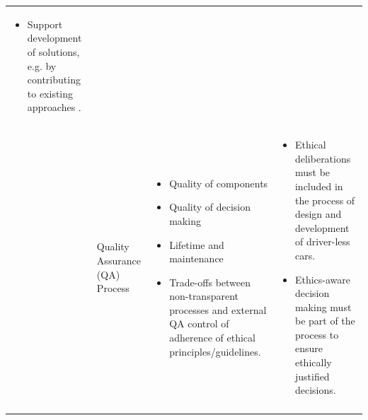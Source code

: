 \begin{table}
\begin{small}
\begin{supertabular}{>{}p{.02\textwidth}|>{\raggedright}p{.105\textwidth}>{\raggedright}p{.4\textwidth}>{\raggedright}p{.4\textwidth}}
\begin{itemize}
					\item Support development of solutions, e.g. by contributing to existing approaches \cite{DepartmentforTransportDfT2017}.
				\end{itemize}
 			 \tabularnewline {}
			& Quality Assurance (QA) Process & 
				\begin{itemize}
				    \item Quality of components
				    \item Quality of decision making
				    \item Lifetime and maintenance
					\item Trade-offs between non-transparent processes and external QA control of adherence of ethical principles/guidelines.
				\end{itemize}                   
			& 
				\begin{itemize}
					\item Ethical deliberations must be included in the process of design and development of driver-less cars.
					\item Ethics-aware decision making must be part of the process to ensure ethically justified decisions.
				\end{itemize}
			\tabularnewline {}
 			 \tabularnewline 					
			\bottomrule
		\end{supertabular}
	\end{small}
	
\end{table}			
			
